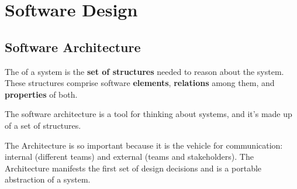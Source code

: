 \section{Software Design}

\subsection{Software Architecture}

\begin{definitionbox}
    The  of a system is the \textbf{set of structures} needed to reason about the system. These structures comprise software \textbf{elements}, \textbf{relations} among them, and \textbf{properties} of both.
\end{definitionbox}

\noindent
The software architecture is a tool for thinking about systems, and it's made up of a set of structures.

\highspace
The Architecture is so important because it is the vehicle for communication: internal (different teams) and external (teams and stakeholders). The Architecture manifests the first set of design decisions and is a portable abstraction of a system.